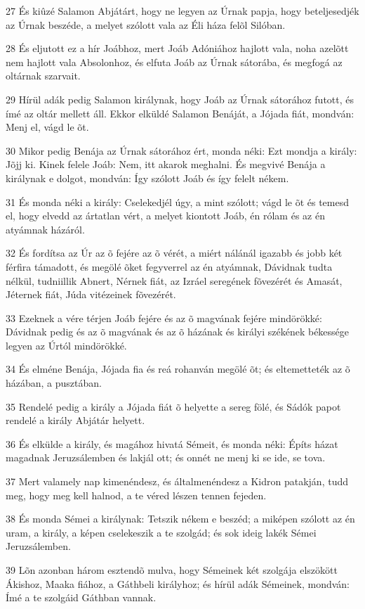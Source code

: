 \par 27 És kiûzé Salamon Abjátárt, hogy ne legyen az Úrnak papja, hogy beteljesedjék az Úrnak beszéde, a melyet szólott vala az Éli  háza felõl Silóban.
\par 28 És eljutott ez a hír Joábhoz, mert Joáb Adóniához hajlott vala, noha azelõtt nem hajlott vala Absolonhoz, és elfuta Joáb az Úrnak sátorába, és megfogá az oltárnak szarvait.
\par 29 Hírül adák pedig Salamon királynak, hogy Joáb az Úrnak sátorához futott, és ímé az oltár  mellett áll. Ekkor elküldé Salamon Benáját, a Jójada fiát, mondván: Menj el, vágd le õt.
\par 30 Mikor pedig Benája az Úrnak sátorához ért, monda néki: Ezt mondja a király: Jõjj ki. Kinek felele Joáb: Nem, itt akarok meghalni. És megvivé Benája a királynak e dolgot, mondván: Így szólott Joáb és így felelt nékem.
\par 31 És monda néki a király: Cselekedjél úgy, a mint szólott; vágd le õt és temesd el, hogy elvedd az ártatlan vért, a melyet kiontott  Joáb, én rólam és az én atyámnak házáról.
\par 32 És fordítsa az Úr az õ fejére az õ vérét, a miért nálánál igazabb és jobb két férfira támadott, és megölé õket fegyverrel az én atyámnak, Dávidnak tudta nélkül, tudniillik Abnert, Nérnek fiát, az Izráel seregének fõvezérét és Amasát,  Jéternek fiát, Júda vitézeinek fõvezérét.
\par 33 Ezeknek a vére térjen Joáb fejére és az õ magvának fejére mindörökké: Dávidnak pedig és az õ magvának és az õ házának és királyi székének békessége legyen az Úrtól mindörökké.
\par 34 És elméne Benája, Jójada fia és reá rohanván megölé õt; és eltemetteték az õ házában, a pusztában.
\par 35 Rendelé pedig a király a Jójada fiát õ helyette a sereg fölé, és  Sádók papot rendelé a király Abjátár helyett.
\par 36 És elkülde a király, és magához hivatá Sémeit, és monda néki: Építs házat magadnak Jeruzsálemben és lakjál ott; és onnét ne menj ki se ide, se tova.
\par 37 Mert valamely nap kimenéndesz, és általmenéndesz a Kidron patakján, tudd meg, hogy meg kell halnod, a te véred lészen tennen fejeden.
\par 38 És monda Sémei a királynak: Tetszik nékem e beszéd; a miképen szólott az én uram, a király, a képen cselekeszik a te szolgád; és sok ideig lakék Sémei Jeruzsálemben.
\par 39 Lõn azonban három esztendõ mulva, hogy Sémeinek két szolgája elszökött Ákishoz, Maaka fiához, a Gáthbeli királyhoz; és hírül adák Sémeinek, mondván: Ímé a te szolgáid Gáthban vannak.
